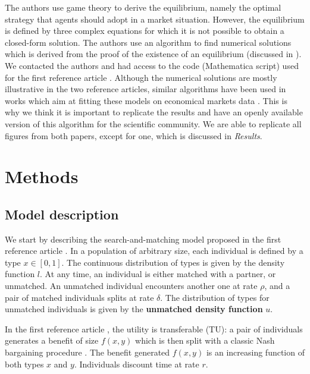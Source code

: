 The authors use game theory to derive the equilibrium, namely the optimal strategy that agents should adopt in a market situation. However, the equilibrium is defined by three complex equations for which it is not possible to obtain a closed-form solution. The authors use an algorithm to find numerical solutions which is derived from the proof of the existence of an equilibrium (discussed in \citep{smith_frictional_2011}). We contacted the authors and had access to the code (Mathematica script) used for the first reference article \citep{shimer_assortative_2000}. Although the numerical solutions are mostly illustrative in the two reference articles, similar algorithms have been used in works which aim at fitting these models on economical markets data \citep{hagedorn_identifying_2017,lise_matching_2016}. This is why we think it is important to replicate the results and have an openly available version of this algorithm for the scientific community. We are able to replicate all figures from both papers, except for one, which is discussed in \textit{Results}.




\section*{Methods}

\subsection*{Model description}

We start by describing the search-and-matching model proposed in the first reference article \citep{shimer_assortative_2000}. In a population of arbitrary size, each individual is defined by a type $x \in [0,1]$. The continuous distribution of types is given by the density function $l$. At any time, an individual is either matched with a partner, or unmatched. An unmatched individual encounters another one at rate $\rho$, and a pair of matched individuals splits at rate $\delta$. The distribution of types for unmatched individuals is given by the \textbf{unmatched density function} $u$.

In the first reference article \citep{shimer_assortative_2000}, the utility is transferable (TU): a pair of individuals generates a benefit of size $f(x,y)$ which is then split with a classic Nash bargaining procedure \citep{osborne_bargaining_1990,shimer_assortative_2000}. The benefit generated $f(x,y)$ is an increasing function of both types $x$ and $y$. Individuals discount time at rate $r$.

